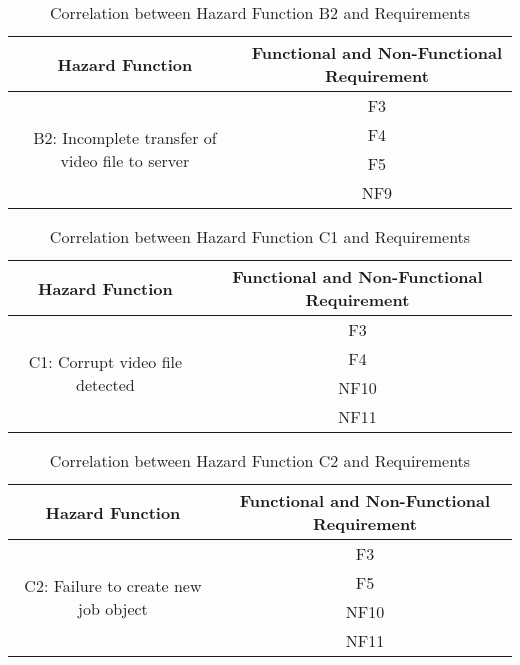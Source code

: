 \documentclass{article}
\begin{document}
\begin{table}[H]
    \centering
    \begin{tabular}{|c|c|} \hline
        \textbf{Hazard Function} & \textbf{Functional and Non-Functional Requirement} \\ \hline
        \multirow{4}{*}{B2: Incomplete transfer of video file to server} & F3\\ \cline{2-2}
         & F4\\ \cline{2-2}
         & F5\\ \cline{2-2}
         & NF9\\ \hline
    \end{tabular}
    \caption{Correlation between Hazard Function B2 and Requirements}
    \label{tab:B2Req}
\end{table}

\begin{table}[H]
    \centering
    \begin{tabular}{|c|c|} \hline
        \textbf{Hazard Function} & \textbf{Functional and Non-Functional Requirement} \\ \hline
        \multirow{4}{*}{C1: Corrupt video file detected} & F3\\ \cline{2-2}
         & F4\\ \cline{2-2}
         & NF10\\ \cline{2-2}
         & NF11\\ \hline
    \end{tabular}
    \caption{Correlation between Hazard Function C1 and Requirements}
    \label{tab:C1Req}
\end{table}

\begin{table}[H]
    \centering
    \begin{tabular}{|c|c|} \hline
        \textbf{Hazard Function} & \textbf{Functional and Non-Functional Requirement} \\ \hline
        \multirow{4}{*}{C2: Failure to create new job object} & F3\\ \cline{2-2}
         &  F5\\ \cline{2-2}
         &  NF10\\ \cline{2-2}
         &  NF11\\ \hline
    \end{tabular}
    \caption{Correlation between Hazard Function C2 and Requirements}
    \label{tab:C2Req}
\end{table}
\end{document}

